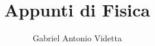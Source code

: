 \documentclass[oneside]{book}
\begin{document}
\author{Gabriel Antonio Videtta}
\title{Appunti di Fisica}

\maketitle

\tableofcontents


\end{document}
